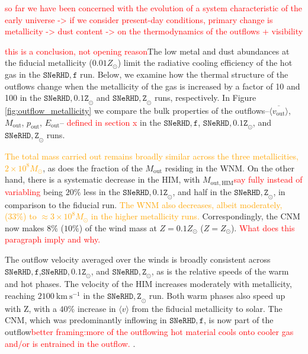 \documentclass[twocolumn,linenumbers]{aastex631}
\begin{document}
\textcolor{red}{so far we have been concerned with the evolution of a system characteristic of the early universe -> if we consider present-day conditions, primary change is metallicity -> dust content -> on the thermodynamics of the outflows + visibility }

\textcolor{red}{this is a conclusion, not opening reason}The low metal and dust abundances at the fiducial metallicity ($0.01Z_\odot$) limit the radiative cooling efficiency of the hot gas in the $\mathtt{SNeRHD,f}$ run. Below, we examine how the thermal structure of the outflows change when the metallicity of the gas is increased by a factor of 10 and 100 in the $\mathtt{SNeRHD,0.1Z}_\odot$ and $\mathtt{SNeRHD,Z}_\odot$ runs, respectively. In Figure \ref{fig:outflow_metallicity} we compare the bulk properties of the outflows--$\overline{\langle v_\mathrm{out} \rangle}$,$M_\mathrm{out}$, $p_\mathrm{out}$, $E_\mathrm{out}$-- \textcolor{red}{defined in section x} in the $\mathtt{SNeRHD,f}$, $\mathtt{SNeRHD,0.1Z}_\odot$, and $\mathtt{SNeRHD,Z}_\odot$ runs. 

\textcolor{orange}{The total mass carried out remains broadly similar across the three metallicities, $2 \times 10^8 M_\odot$}, as does the fraction of the $M_\mathrm{out}$ residing in the WNM. On the other hand, there is a systematic decrease in the HIM, with $M_\mathrm{out,HIM}$\textcolor{red}{say fully instead of variabling} being $20\%$ less in the $\mathtt{SNeRHD,0.1Z}_\odot$, and half in the  $\mathtt{SNeRHD,Z}_\odot$, in comparison to the fiducial run. \textcolor{orange}{The WNM also decreases, albeit moderately, (33\%) to $\approx 3\times10^8M_\odot$ in the higher metallicity runs.} Correspondingly, the CNM now makes $8\%$ ($10\%$) of the wind mass at $Z=0.1Z_\odot$ ($Z=Z_\odot$). \textcolor{red}{What does this paragraph imply and why.}

The outflow velocity averaged over the winds is broadly consistent across $\mathtt{SNeRHD,f}$,$\mathtt{SNeRHD,0.1Z}_\odot$, and $\mathtt{SNeRHD,Z}_\odot$, as is the relative speeds of the warm and hot phases. The velocity of the HIM increases moderately with metallicity, reaching $2100\ \mathrm{km\ s^{-1}}$ in the $\mathtt{SNeRHD,Z}_\odot$ run. Both warm phases also speed up with Z, with a $40\%$ increase in $\langle v \rangle$ from the fiducial metallicity to solar. The CNM, which was predominantly inflowing in $\mathtt{SNeRHD,f}$, is now part of the outflow\textcolor{red}{better framing:more of the outflowing hot material cools onto cooler gas and/or is entrained in the outflow. }. 
\end{document}
